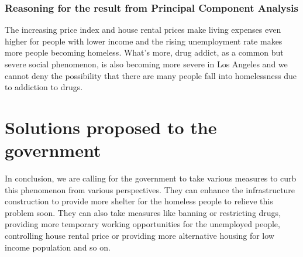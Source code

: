 \documentclass[]{article}
\begin{document}
\hypertarget{reasoning-for-the-result-from-principal-component-analysis}{%
\subsubsection{Reasoning for the result from Principal Component
Analysis}\label{reasoning-for-the-result-from-principal-component-analysis}}

The increasing price index and house rental prices make living expenses
even higher for people with lower income and the rising unemployment
rate makes more people becoming homeless. What's more, drug addict, as a
common but severe social phenomenon, is also becoming more severe in Los
Angeles and we cannot deny the possibility that there are many people
fall into homelessness due to addiction to drugs.

\hypertarget{solutions-proposed-to-the-government}{%
\section{Solutions proposed to the
government}\label{solutions-proposed-to-the-government}}

In conclusion, we are calling for the government to take various
measures to curb this phenomenon from various perspectives. They can
enhance the infrastructure construction to provide more shelter for the
homeless people to relieve this problem soon. They can also take
measures like banning or restricting drugs, providing more temporary
working opportunities for the unemployed people, controlling house
rental price or providing more alternative housing for low income
population and so on.
\end{document}
